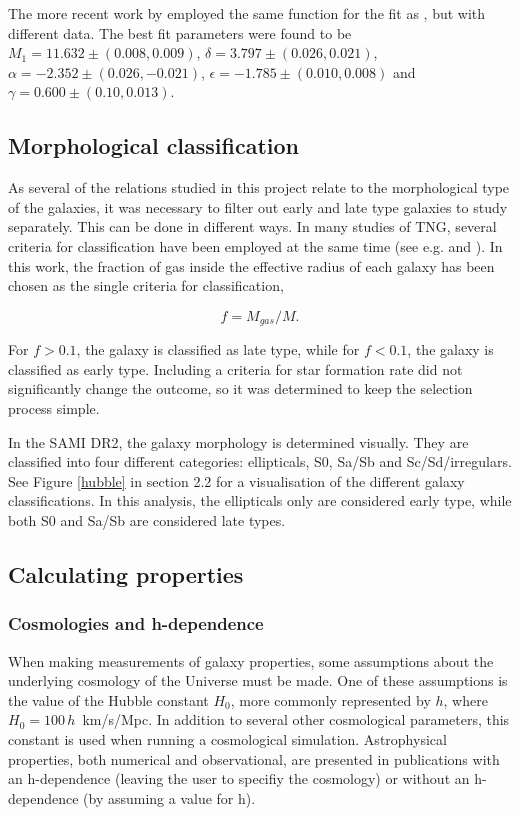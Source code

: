 The more recent work by \textcite{Zanisi2019} employed the same function for the fit as \textcite{Behroozi2013}, but with different data. The best fit parameters were found to be $M_1 = 11.632\pm(0.008, 0.009)$, $\delta = 3.797 \pm (0.026, 0.021)$, $\alpha = -2.352 \pm (0.026, -0.021)$, $\epsilon = -1.785 \pm (0.010, 0.008)$  and $\gamma = 0.600 \pm (0.10, 0.013)$.

\subsection{Morphological classification}
As several of the relations studied in this project relate to the morphological type of the galaxies, it was necessary to filter out early and late type galaxies to study separately. This can be done in different ways. In many studies of TNG, several criteria for classification have been employed at the same time (see e.g. \textcite{Lu2020} and \textcite{Genel2017}). In this work, the fraction of gas inside the effective radius of each galaxy has been chosen as the single criteria for classification, 

\begin{equation}
    f = M_{gas}/M.
\end{equation}

For $f > 0.1$, the galaxy is classified as late type, while for $f< 0.1$, the galaxy is classified as early type. Including a criteria for star formation rate did not significantly change the outcome, so it was determined to keep the selection process simple.

In the SAMI DR2, the galaxy morphology is determined visually. They are classified into four different categories: ellipticals, S0, Sa/Sb and Sc/Sd/irregulars. See Figure \ref{hubble} in section 2.2 for a visualisation of the different galaxy classifications. In this analysis, the ellipticals only are considered early type, while both S0 and Sa/Sb are considered late types.

\subsection{Calculating properties}

\subsubsection{Cosmologies and h-dependence} \label{cosmologies}
When making measurements of galaxy properties, some assumptions about the underlying cosmology of the Universe must be made. One of these assumptions is the value of the Hubble constant $H_0$, more commonly represented by $h$, where $H_0 = 100\,h\,$ km/s/Mpc. In addition to several other cosmological parameters, this constant is used when running a cosmological simulation. Astrophysical properties, both numerical and observational, are presented in publications with an h-dependence (leaving the user to specifiy the cosmology) or without an h-dependence (by assuming a value for h).

